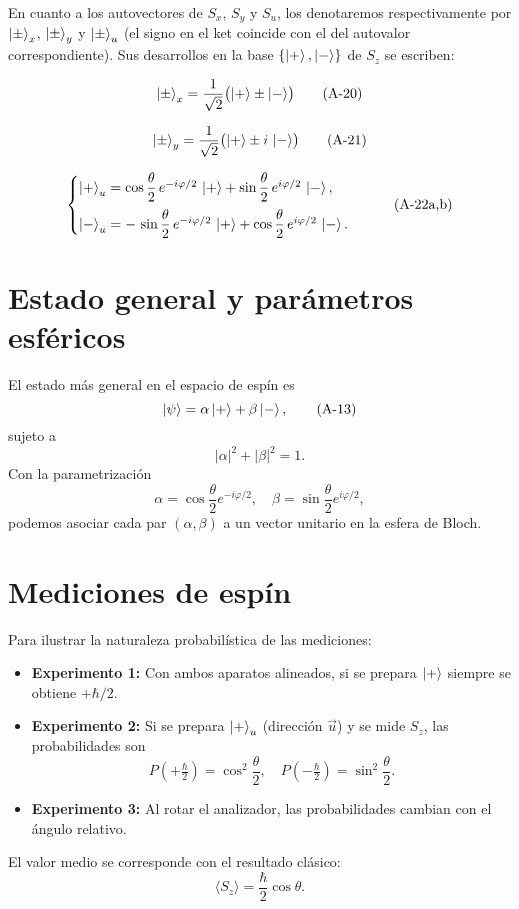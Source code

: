 \documentclass[a4paper,11pt]{article}
\begin{document}
En cuanto a los autovectores de $S_x$, $S_y$ y $S_u$, los denotaremos respectivamente por $\ket{\pm}_x$, $\ket{\pm}_y$ y $\ket{\pm}_u$ (el signo en el ket coincide con el del autovalor correspondiente). Sus desarrollos en la base $\{\ket{+},\ket{-}\}$ de $S_z$ se escriben:

\begin{equation}
\ket{\pm}_x = \frac{1}{\sqrt{2}}\bigl(\ket{+}\pm\ket{-}\bigr)
\tag{A-20}
\end{equation}

\begin{equation}
\ket{\pm}_y = \frac{1}{\sqrt{2}}\bigl(\ket{+}\pm i\,\ket{-}\bigr)
\tag{A-21}
\end{equation}

\begin{equation}
\begin{cases}
\ket{+}_u = \cos\dfrac{\theta}{2}\,e^{-i\varphi/2}\,\ket{+}
           + \sin\dfrac{\theta}{2}\,e^{i\varphi/2}\,\ket{-},\\[8pt]
\ket{-}_u = -\,\sin\dfrac{\theta}{2}\,e^{-i\varphi/2}\,\ket{+}
           + \cos\dfrac{\theta}{2}\,e^{i\varphi/2}\,\ket{-}.
\end{cases}
\tag{A-22a,b}
\end{equation}

\section{Estado general y parámetros esféricos}
El estado más general en el espacio de espín es
\begin{equation}
\ket{\psi} = \alpha \ket{+} + \beta \ket{-},
\tag{A-13}
\end{equation}
sujeto a
\begin{equation}
|\alpha|^2 + |\beta|^2 = 1.
\tag{A-14}
\end{equation}
Con la parametrización
\[
\alpha = \cos\frac{\theta}{2}e^{-i\varphi/2},\quad
\beta  = \sin\frac{\theta}{2}e^{i\varphi/2},
\]
podemos asociar cada par $(\alpha,\beta)$ a un vector unitario en la esfera de Bloch.

\section{Mediciones de espín}
Para ilustrar la naturaleza probabilística de las mediciones:
\begin{itemize}
    \item \textbf{Experimento 1:} Con ambos aparatos alineados, si se prepara $\ket{+}$ siempre se obtiene $+\hbar/2$.
    \item \textbf{Experimento 2:} Si se prepara $\ket{+}_u$ (dirección $\vec{u}$) y se mide $S_z$, las probabilidades son
        \[
            P(+\tfrac{\hbar}{2}) = \cos^2\frac{\theta}{2},\quad
            P(-\tfrac{\hbar}{2}) = \sin^2\frac{\theta}{2}.
        \]
    \item \textbf{Experimento 3:} Al rotar el analizador, las probabilidades cambian con el ángulo relativo.
\end{itemize}
El valor medio se corresponde con el resultado clásico:
\[
\langle S_z\rangle = \frac{\hbar}{2}\cos\theta.
\]
\end{document}
